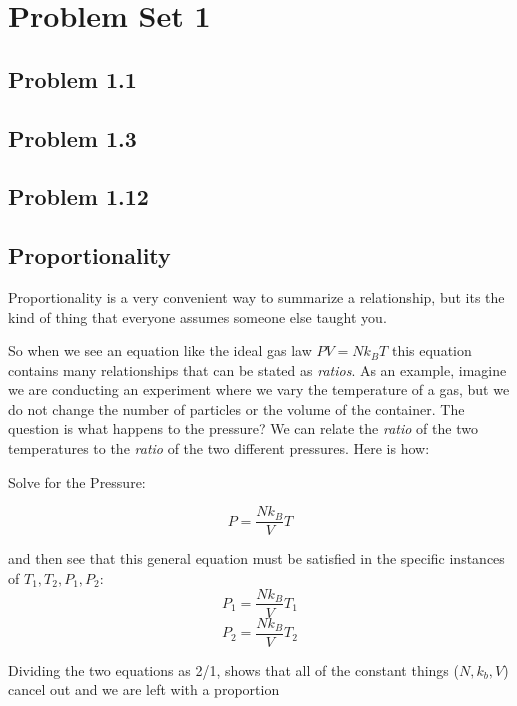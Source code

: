 \hypertarget{problem-set-1}{%
\section{Problem Set 1}\label{problem-set-1}}

\hypertarget{problem-1.1}{%
\subsection{Problem 1.1}\label{problem-1.1}}

\hypertarget{problem-1.3}{%
\subsection{Problem 1.3}\label{problem-1.3}}

\hypertarget{problem-1.12}{%
\subsection{Problem 1.12}\label{problem-1.12}}

\hypertarget{proportionality}{%
\subsection{Proportionality}\label{proportionality}}

Proportionality is a very convenient way to summarize a relationship,
but its the kind of thing that everyone assumes someone else taught you.

So when we see an equation like the ideal gas law \(P V = N k_B T\) this
equation contains many relationships that can be stated as
\emph{ratios}. As an example, imagine we are conducting an experiment
where we vary the temperature of a gas, but we do not change the number
of particles or the volume of the container. The question is what
happens to the pressure? We can relate the \emph{ratio} of the two
temperatures to the \emph{ratio} of the two different pressures. Here is
how:

Solve for the Pressure:

\[ P = \frac{N k_B}{V} T \]

and then see that this general equation must be satisfied in the
specific instances of \(T_1, T_2, P_1, P_2\):
\[ P_1 = \frac{N k_B}{V} T_1 \] \[ P_2 = \frac{N k_B}{V} T_2 \]

Dividing the two equations as 2/1, shows that all of the constant things
(\(N, k_b, V\)) cancel out and we are left with a proportion

